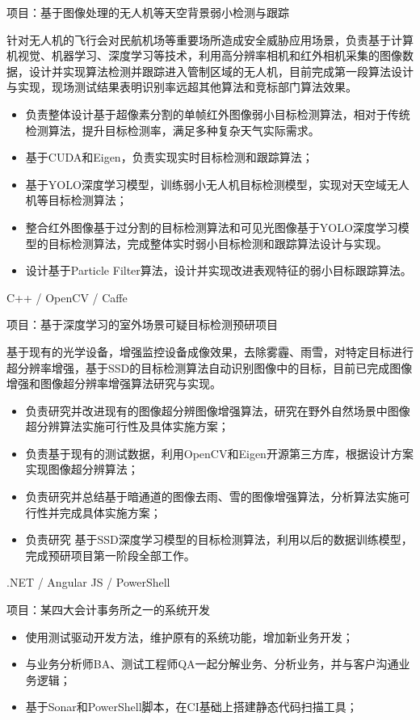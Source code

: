 \documentclass{resume}
\begin{document}
项目：基于图像处理的无人机等天空背景弱小检测与跟踪

针对无人机的飞行会对民航机场等重要场所造成安全威胁应用场景，负责基于计算机视觉、机器学习、深度学习等技术，利用高分辨率相机和红外相机采集的图像数据，设计并实现算法检测并跟踪进入管制区域的无人机，目前完成第一段算法设计与实现，现场测试结果表明识别率远超其他算法和竞标部门算法效果。
\begin{itemize}
  \item 负责整体设计基于超像素分割的单帧红外图像弱小目标检测算法，相对于传统检测算法，提升目标检测率，满足多种复杂天气实际需求。
  \item 基于CUDA和Eigen，负责实现实时目标检测和跟踪算法；
  \item 基于YOLO深度学习模型，训练弱小无人机目标检测模型，实现对天空域无人机等目标检测算法；
  \item 整合红外图像基于过分割的目标检测算法和可见光图像基于YOLO深度学习模型的目标检测算法，完成整体实时弱小目标检测和跟踪算法设计与实现。
  \item 设计基于Particle Filter算法，设计并实现改进表观特征的弱小目标跟踪算法。
\end{itemize}

C++ / OpenCV / Caffe

项目：基于深度学习的室外场景可疑目标检测预研项目

基于现有的光学设备，增强监控设备成像效果，去除雾霾、雨雪，对特定目标进行超分辨率增强，基于SSD的目标检测算法自动识别图像中的目标，目前已完成图像增强和图像超分辨率增强算法研究与实现。
\begin{itemize}
  \item 负责研究并改进现有的图像超分辨图像增强算法，研究在野外自然场景中图像超分辨算法实施可行性及具体实施方案；
  \item 负责基于现有的测试数据，利用OpenCV和Eigen开源第三方库，根据设计方案实现图像超分辨算法；
  \item 负责研究并总结基于暗通道的图像去雨、雪的图像增强算法，分析算法实施可行性并完成具体实施方案；
  \item 负责研究 基于SSD深度学习模型的目标检测算法，利用以后的数据训练模型，完成预研项目第一阶段全部工作。
\end{itemize}

.NET / Angular JS / PowerShell

项目：某四大会计事务所之一的系统开发
\begin{itemize}
  \item 使用测试驱动开发方法，维护原有的系统功能，增加新业务开发；
  \item 与业务分析师BA、测试工程师QA一起分解业务、分析业务，并与客户沟通业务逻辑；
  \item 基于Sonar和PowerShell脚本，在CI基础上搭建静态代码扫描工具；
\end{itemize}
\end{document}
